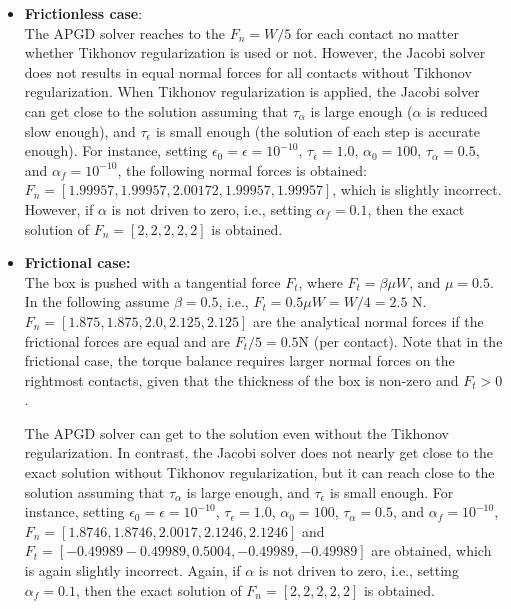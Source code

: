 \begin{itemize}
	\item \textbf{Frictionless case}:\\
	The APGD solver reaches to the $F_n=W/5$ for each contact no matter whether Tikhonov regularization is used or not. However, 
	the Jacobi solver does not results in equal normal forces for all contacts without Tikhonov regularization. When Tikhonov regularization is applied, the Jacobi solver can get close to the solution assuming that
	$\tau_\alpha$ is large enough ($\alpha$ is reduced slow enough), and $\tau_\epsilon$ is small enough (the solution of each step is accurate enough). For instance, setting $\epsilon_0=\epsilon=10^{-10}$, $\tau_\epsilon=1.0$, $\alpha_0=100$, $\tau_\alpha=0.5$, and $\alpha_f=10^{-10}$, the following normal forces is obtained:
	$F_n=[1.99957, 1.99957, 2.00172, 1.99957, 1.99957]$, which is slightly incorrect. However, if $\alpha$ is not driven to zero, i.e., setting $\alpha_f=0.1$, then the exact solution of $F_n=[2, 2, 2, 2, 2]$ is obtained.
	
	\item 	\textbf{Frictional case:}\\
	The box is pushed with a tangential force $F_t$, where $F_t = \beta \mu W$, and $\mu=0.5$. In the following assume $\beta=0.5$,  i.e., $F_t = 0.5\mu W = W/4= 2.5 $ \si{N}. $F_n=[1.875, 1.875, 2.0, 2.125, 2.125]$ are the analytical normal forces if the frictional forces are equal and are $F_t/5 = 0.5$\si{N} (per contact).
	Note that in the frictional case, the torque balance requires larger normal forces on the rightmost contacts, given that the thickness of the box is non-zero and $F_t>0$.
	
	The APGD solver can get to the solution even without the Tikhonov regularization. In contrast, the Jacobi solver does not nearly get close to the exact solution without Tikhonov regularization, but it can reach close to the solution assuming that $\tau_\alpha$ is large enough, and $\tau_\epsilon$ is small enough. For instance, setting $\epsilon_0=\epsilon=10^{-10}$, $\tau_\epsilon=1.0$, $\alpha_0=100$, $\tau_\alpha=0.5$, and $\alpha_f=10^{-10}$,  
	$F_n=[1.8746, 1.8746, 2.0017, 2.1246, 2.1246]$ and $F_t=[-0.49989 -0.49989, 0.5004, -0.49989, -0.49989]$ are obtained, which is again slightly incorrect. Again, if $\alpha$ is not driven to zero, i.e., setting $\alpha_f=0.1$, then the exact solution of $F_n=[2, 2, 2, 2, 2]$ is obtained.
\end{itemize}



